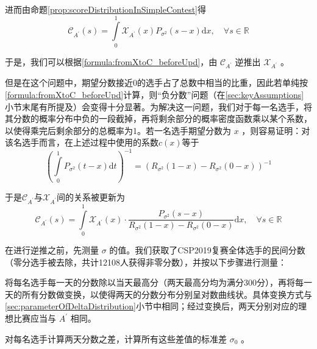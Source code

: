         进而由命题\ref{prop:scoreDistributionInSimpleContest}得
        \begin{equation}
            \mathcal{C}_{A^\prime}(s)=\int\limits_0^1 \mathcal{X}_{A^\prime}(x)P_{\sigma^2}(s-x)\mathrm{d}x,\quad\forall s\in\mathbb{R}
            \label{formula:fromXtoC_beforeUpd}
        \end{equation}

        于是，我们可以根据\eqref{formula:fromXtoC_beforeUpd}，由 $\mathcal{C}_{A^\prime}$ 逆推出 $\mathcal{X}_{A^\prime}$ 。

        但是在这个问题中，期望分数接近0的选手占了总数中相当的比重，因此若单纯按\eqref{formula:fromXtoC_beforeUpd}计算，则“负分数”问题（在\ref{sec:keyAssumptions}小节末尾有所提及）会变得十分显著。为解决这一问题，我们对于每一名选手，将其分数的概率分布中负的一段截掉，再将剩余部分的概率密度函数乘以某个系数，以使得乘完后剩余部分的总概率为1。若一名选手期望分数为 $x$ ，则容易证明：对该名选手而言，在上述过程中使用的系数$c(x)$等于 $$\left(\int\limits_0^1 P_{\sigma^2}(t-x)\mathrm{d}t\right)^{-1}=\left(R_{\sigma^2}(1-x)-R_{\sigma^2}(0-x)\right)^{-1}$$

        于是$\mathcal{C}_{A^\prime}$与$\mathcal{X}_{A^\prime}$间的关系被更新为
        \begin{equation}
            \mathcal{C}_{A^\prime}(s)=\int\limits_0^1 \mathcal{X}_{A^\prime}(x)\cdot\frac{P_{\sigma^2}(s-x)}{R_{\sigma^2}(1-x)-R_{\sigma^2}(0-x)}\mathrm{d}x,\quad\forall s\in\mathbb{R}
            \label{formula:fromXtoC}
        \end{equation}

        \vspace{1.5ex}

        在进行逆推之前，先测量 $\sigma$ 的值。我们获取了CSP2019复赛全体选手的民间分数（零分选手被去除，共计12108人获得非零分数），并按以下步骤进行测量：
        \begin{asparaenum}[\bfseries{步骤} 1.]
            \item 将每名选手每一天的分数除以当天最高分（两天最高分均为满分300分），再将每一天的所有分数做变换，以使得两天的分数分布分别呈对数曲线状。具体变换方式与\ref{sec:parameterOfDeltaDistribution}小节中相同；经过变换后，两天分别对应的理想比赛应当与 $A^\prime$ 相同。
            \item 对每名选手计算两天分数之差，计算所有这些差值的标准差 $\sigma_0$ 。
        \end{asparaenum}

        \vspace{1.5ex}

